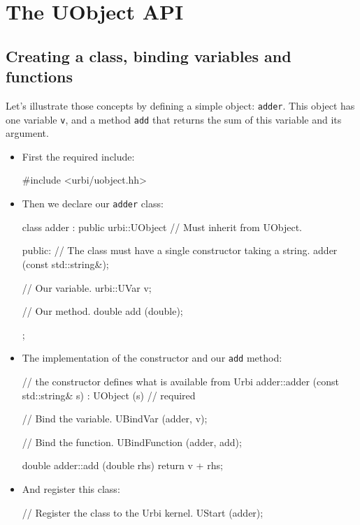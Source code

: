 \chapter{The UObject API}
\label{sec:uob:api}
\newcommand{\UBinary}{\lstinline{UBinary}\xspace}
\newcommand{\USound}{\lstinline{USound}\xspace}
\newcommand{\UImage}{\lstinline{UImage}\xspace}
\newcommand{\UVar}{\lstinline{UVar}\xspace}
\newcommand{\UObject}{\lstinline{UObject}\xspace}
\newcommand{\UObjectHub}{\lstinline{UObjectHub}\xspace}
\section{Creating a class, binding variables and functions}
\label{sec:uob:api:bind}

Let's illustrate those concepts by defining a simple object:
\lstinline{adder}. This object has one variable \lstinline{v}, and a
method \lstinline{add} that returns the sum of this variable and its
argument.

\begin{itemize}
\item First the required include:

\begin{cxx}
#include <urbi/uobject.hh>
\end{cxx}

\item Then we declare our \lstinline{adder} class:
\begin{cxx}
class adder : public urbi::UObject // Must inherit from UObject.
{
  public:
   // The class must have a single constructor taking a string.
   adder (const std::string&);

   // Our variable.
   urbi::UVar v;

   // Our method.
   double add (double);
};
\end{cxx}
\item The implementation of the constructor and our \lstinline{add}
  method:
\begin{cxx}
// the constructor defines what is available from Urbi
adder::adder (const std::string& s)
  : UObject (s) // required
{
  // Bind the variable.
  UBindVar (adder, v);

  // Bind the function.
  UBindFunction (adder, add);
}

double
adder::add (double rhs)
{
  return v + rhs;
}
\end{cxx}
\item And register this class:
\begin{cxx}
// Register the class to the Urbi kernel.
UStart (adder);
\end{cxx}
\end{itemize}

